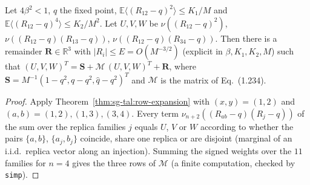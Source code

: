 \begin{theorem}
\label{thm:sg-tal:cov-system}
  \leanok
{}
Let $4\beta^2<1$, $q$ the fixed point, $\mathbb E\langle(R_{12}-q)^2\rangle\le K_1/M$ and $\mathbb E\langle(R_{12}-q)^4\rangle\le K_2/M^2$.  Let $U,V,W$ be $\nu((R_{12}-q)^2)$, $\nu((R_{12}-q)(R_{13}-q))$, $\nu((R_{12}-q)(R_{34}-q))$.  Then there is a remainder $\mathbf R\in\mathbb R^3$ with $|R_i|\le E=O(M^{-3/2})$ (explicit in $\beta,K_1,K_2,M$) such that $(U,V,W)^T=\mathbf S+\mathcal M\,(U,V,W)^T+\mathbf R$, where $\mathbf S=M^{-1}(1-q^2,q-q^2,\hat q-q^2)^T$ and $\mathcal M$ is the matrix of Eq.~(1.234).
\end{theorem}
\begin{proof}
  \leanok
Apply Theorem~\ref{thm:sg-tal:row-expansion} with $(x,y)=(1,2)$ and $(a,b)=(1,2),(1,3),(3,4)$.  Every term $\nu_{n+2}((R_{ab}-q)(R_j-q))$ of the sum over the replica families $j$ equals $U$, $V$ or $W$ according to whether the pairs $\{a,b\}$, $\{a_j,b_j\}$ coincide, share one replica or are disjoint (marginal of an i.i.d.\ replica vector along an injection).  Summing the signed weights over the $11$ families for $n=4$ gives the three rows of $\mathcal M$ (a finite computation, checked by \texttt{simp}).
\end{proof}

